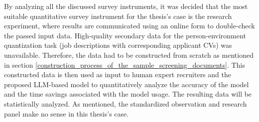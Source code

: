 \documentclass[draft,final]{thesisclass} %
\begin{document}
By analyzing all the discussed survey instruments, it was decided that the most suitable quantitative survey instrument for the thesis's case is the research experiment, where results are communicated using an online form to double-check the passed input data.
High-quality secondary data for the person-environment quantization task (job descriptions with corresponding applicant \acs{CV}s) was unavailable. Therefore, the data had to be constructed from scratch as mentioned in section \ref{construction_process_of_the_sample_screening_documents}.
This constructed data is then used as input to human expert recruiters and the proposed \acs{LLM}-based model to quantitatively analyze the accuracy of the model and the time savings associated with the model usage.
The resulting data will be statistically analyzed.
As mentioned, the standardized observation and research panel make no sense in this thesis's case.
\end{document}
